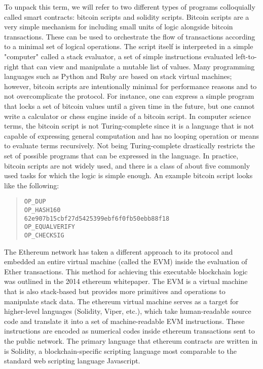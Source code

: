 To unpack this term, we will refer to two different types of programs
colloquially called smart contracts: bitcoin scripts and solidity scripts.
Bitcoin scripts are a very simple mechanism for including small units of logic
alongside bitcoin transactions. These can be used to orchestrate the flow of
transactions according to a minimal set of logical operations. The script itself
is interpreted in a simple "computer" called a stack evaluator, a set of simple
instructions evaluated left-to-right that can view and manipulate a mutable list
of values. Many programming languages such as Python and Ruby are based on stack
virtual machines; however, bitcoin scripts are intentionally minimal for
performance reasons and to not overcomplicate the protocol. For instance, one
can express a simple program that locks a set of bitcoin values until a given
time in the future, but one cannot write a calculator or chess engine inside of
a bitcoin script. In computer science terms, the bitcoin script is not
Turing-complete since it is a language that is not capable of expressing general
computation and has no looping operation or means to evaluate terms recursively.
Not being Turing-complete drastically restricts the set of possible programs
that can be expressed in the language. In practice, bitcoin scripts are not
widely used, and there is a class of about five commonly used tasks for which
the logic is simple enough. An example bitcoin script looks like the following:

\begin{quote}
\begin{verbatim}
OP_DUP
OP_HASH160
62e907b15cbf27d5425399ebf6f0fb50ebb88f18
OP_EQUALVERIFY
OP_CHECKSIG
\end{verbatim}
\end{quote}


The Ethereum network has taken a different approach to its protocol and embedded
an entire virtual machine (called the EVM) inside the evaluation of Ether
transactions. This method for achieving this executable blockchain logic was
outlined in the 2014 ethereum whitepaper. The EVM is a virtual machine that is
also stack-based but provides more primitives and operations to manipulate stack
data. The ethereum virtual machine serves as a target for higher-level languages
(Solidity, Viper, etc.), which take human-readable source code and translate it
into a set of machine-readable EVM instructions. These instructions are encoded
as numerical codes inside ethereum transactions sent to the public network. The
primary language that ethereum contracts are written in is Solidity, a
blockchain-specific scripting language most comparable to the standard web
scripting language Javascript.

